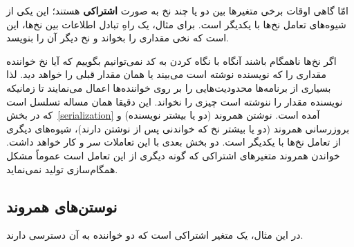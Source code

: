 \documentclass{book}
\begin{document}
    امّا گاهی اوقات برخی متغیرها بین دو یا چند نخ به صورت \textbf{اشتراکی} هستند؛ این 
    یکی از شیوه‌های تعامل نخ‌ها با یکدیگر است. برای مثال، یک راهِ  تبادل اطلاعات بین نخ‌ها، این است که نخی مقداری را بخواند و نخ دیگر آن را بنویسد. 
    
    اگر نخ‌ها ناهمگام باشند آنگاه با نگاه کردن به کد نمی‌توانیم بگوییم که آیا نخ خواننده مقداری را که نویسنده نوشته است می‌بیند یا همان مقدار قبلی را خواهد دید. 
    لذا بسیاری از برنامه‌ها محدودیت‌هایی را بر روی خواننده‌ها اعمال می‌نمایند تا زمانیکه نویسنده مقدار را ننوشته است چیزی را نخواند. 
    این دقیقا همان مساله تسلسل است که در بخش~\ref{serialization} آمده است. 
    نوشتن همروند (دو یا بیشتر نویسنده) و بروزرسانی همروند (دو یا بیشتر نخ که خواندنی پس از نوشتن دارند)، شیوه‌های دیگری از تعامل 
    نخ‌ها با یکدیگر است. دو بخش بعدی با این تعاملات سر و کار خواهد داشت. خواندن همروند متغیرهای اشتراکی که گونه دیگری از این تعامل است 
    عموماً مشکل همگام‌سازی تولید نمی‌نماید. 


\subsection {نوستن‌های همروند}
در این مثال،  یک متغیر اشتراکی است که دو خواننده به آن دسترسی دارند. 
\end{document}
